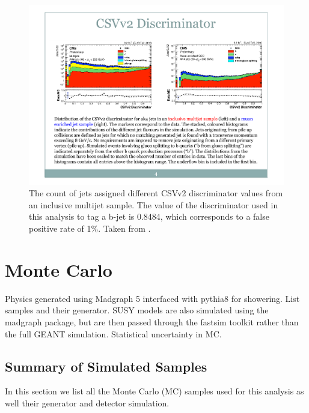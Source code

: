     \begin{figure}[!h]
      \centering
      \includegraphics[width=.8\textwidth]{figures/csv_v2_performance.pdf}
      \caption{The count of jets assigned different CSVv2 discriminator values from an inclusive multijet sample. The value of the discriminator used in this analysis to tag a b-jet is 0.8484, which corresponds to a false positive rate of 1\%. Taken from \cite{csv_v2_performance}.}
      \label{fig:csv_v2_performance}
    \end{figure}

\section{Monte Carlo} \label{sec:monte_carlo}
  Physics generated using Madgraph 5 interfaced with pythia8 for showering. List samples and their generator.
  SUSY models are also simulated using the madgraph package, but are then passed through the fastsim toolkit \cite{fastsim} rather than the full GEANT simulation. Statistical uncertainty in MC.
  \subsection{Summary of Simulated Samples} \label{sec:summary_of_simulated_samples}
    
    In this section we list all the Monte Carlo (MC) samples used for this analysis as well their generator and detector simulation.

